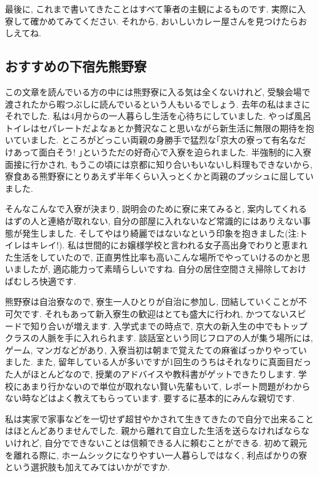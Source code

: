 \documentclass[10pt,b5jsbook,dvips,dvipdfmx,openany]{jsbook}
\theoremstyle{definition}
\begin{document}
		最後に, これまで書いてきたことはすべて筆者の主観によるものです. 実際に入寮して確かめてみてください. それから, おいしいカレー屋さんを見つけたらおしえてね.


		\subsection{おすすめの下宿先熊野寮}

		この文章を読んでいる方の中には熊野寮に入る気は全くないけれど, 受験会場で渡されたから暇つぶしに読んでいるという人もいるでしょう. 去年の私はまさにそれでした. 私は4月からの一人暮らし生活を心待ちにしていました. やっぱ風呂トイレはセパレートだよなぁとか贅沢なこと思いながら新生活に無限の期待を抱いていました. ところがどっこい両親の身勝手で猛烈な｢京大の寮って有名なだけあって面白そう! ｣というただの好奇心で入寮を迫られました. 半強制的に入寮面接に行かされ, もうこの頃には京都に知り合いもいないし料理もできないから, 寮食ある熊野寮にとりあえず半年くらい入っとくかと両親のプッシュに屈していました.

		そんなこんなで入寮が決まり, 説明会のために寮に来てみると, 案内してくれるはずの人と連絡が取れない, 自分の部屋に入れないなど常識的にはありえない事態が発生しました. そしてやはり綺麗ではないなという印象を抱きました(注:トイレはキレイ!). 私は世間的にお嬢様学校と言われる女子高出身でわりと恵まれた生活をしていたので, 正直男性比率も高いこんな場所でやっていけるのかと思いましたが, 適応能力って素晴らしいですね. 自分の居住空間さえ掃除しておけばむしろ快適です.

		熊野寮は自治寮なので, 寮生一人ひとりが自治に参加し, 団結していくことが不可欠です. それもあって新入寮生の歓迎はとても盛大に行われ, かつてないスピードで知り合いが増えます. 入学式までの時点で, 京大の新入生の中でもトップクラスの人脈を手に入れられます. 談話室という同じフロアの人が集う場所には, ゲーム, マンガなどがあり, 入寮当初は朝まで覚えたての麻雀ばっかりやっていました. また, 留年している人が多いですが1回生のうちはそれなりに真面目だった人がほとんどなので, 授業のアドバイスや教科書がゲットできたりします. 学校にあまり行かないので単位が取れない賢い先輩もいて, レポート問題がわからない時などはよく教えてもらっています. 要するに基本的にみんな親切です.

		私は実家で家事などを一切せず超甘やかされて生きてきたので自分で出来ることはほとんどありませんでした. 親から離れて自立した生活を送らなければならないけれど, 自分でできないことは信頼できる人に頼むことができる. 初めて親元を離れる際に, ホームシックになりやすい一人暮らしではなく, 利点ばかりの寮という選択肢も加えてみてはいかがですか.
\end{document}
